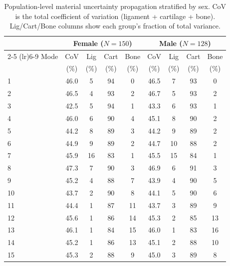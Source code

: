 \begin{table}[htbp]
\centering
\small
\caption{Population-level material uncertainty propagation stratified by sex. CoV is the total coefficient of variation (ligament + cartilage + bone). Lig/Cart/Bone columns show each group's fraction of total variance.}
\label{tab:material_uncertainty}
\begin{tabular}{l cccc cccc}
\toprule
& \multicolumn{4}{c}{Female ($N=150$)} & \multicolumn{4}{c}{Male ($N=128$)} \\
\cmidrule(lr){2-5} \cmidrule(lr){6-9}
Mode & CoV & Lig & Cart & Bone & CoV & Lig & Cart & Bone \\
     & (\%) & (\%) & (\%) & (\%) & (\%) & (\%) & (\%) & (\%) \\
\midrule
1 & 46.0 & 5 & 94 & 0 & 46.5 & 7 & 93 & 0 \\
2 & 46.5 & 4 & 93 & 2 & 46.7 & 5 & 93 & 2 \\
3 & 42.5 & 5 & 94 & 1 & 43.3 & 6 & 93 & 1 \\
4 & 46.0 & 6 & 90 & 4 & 45.1 & 8 & 90 & 2 \\
5 & 44.2 & 8 & 89 & 3 & 44.2 & 9 & 89 & 2 \\
6 & 44.9 & 9 & 89 & 2 & 44.7 & 10 & 88 & 2 \\
7 & 45.9 & 16 & 83 & 1 & 45.5 & 15 & 84 & 1 \\
8 & 47.3 & 7 & 90 & 3 & 46.9 & 6 & 91 & 3 \\
9 & 45.2 & 4 & 88 & 7 & 43.9 & 4 & 90 & 5 \\
10 & 43.7 & 2 & 90 & 8 & 44.1 & 5 & 90 & 6 \\
11 & 44.4 & 1 & 87 & 11 & 43.7 & 3 & 89 & 9 \\
12 & 45.6 & 1 & 86 & 14 & 45.3 & 2 & 85 & 13 \\
13 & 46.1 & 1 & 84 & 15 & 46.0 & 1 & 83 & 16 \\
14 & 45.2 & 1 & 86 & 13 & 45.1 & 2 & 88 & 10 \\
15 & 45.3 & 2 & 88 & 9 & 45.0 & 3 & 89 & 8 \\
\bottomrule
\end{tabular}
\end{table}
